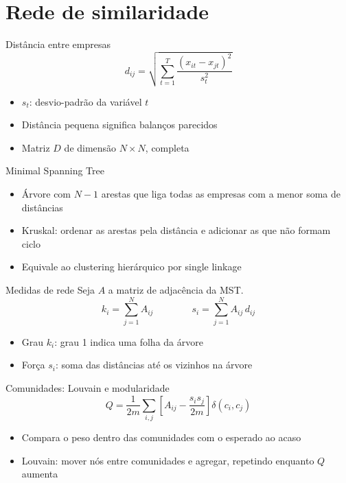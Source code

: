 
\section{Rede de similaridade}

\begin{frame}{Distância entre empresas}
  \[
    d_{ij} = \sqrt{\sum_{t=1}^{T} \frac{(x_{it} - x_{jt})^2}{s_t^2}}
  \]
  \begin{itemize}
    \item $s_t$: desvio-padrão da variável $t$
    \item Distância pequena significa balanços parecidos
    \item Matriz $D$ de dimensão $N \times N$, completa
  \end{itemize}
\end{frame}

\begin{frame}{Minimal Spanning Tree}
  \begin{itemize}
    \item Árvore com $N-1$ arestas que liga todas as empresas com a menor soma de distâncias
    \item Kruskal: ordenar as arestas pela distância e adicionar as que não formam ciclo
    \item Equivale ao clustering hierárquico por single linkage
  \end{itemize}
\end{frame}

\begin{frame}{Medidas de rede}
  Seja $A$ a matriz de adjacência da MST.
  \[
    k_i = \sum_{j=1}^{N} A_{ij}
    \qquad\qquad
    s_i = \sum_{j=1}^{N} A_{ij}\, d_{ij}
  \]
  \begin{itemize}
    \item Grau $k_i$: grau 1 indica uma folha da árvore
    \item Força $s_i$: soma das distâncias até os vizinhos na árvore
  \end{itemize}
\end{frame}

\begin{frame}{Comunidades: Louvain e modularidade}
  \[
    Q = \frac{1}{2m} \sum_{i,j} \left[ A_{ij} - \frac{s_i s_j}{2m} \right] \delta(c_i, c_j)
  \]
  \begin{itemize}
    \item Compara o peso dentro das comunidades com o esperado ao acaso
    \item Louvain: mover nós entre comunidades e agregar, repetindo enquanto $Q$ aumenta
  \end{itemize}
\end{frame}
